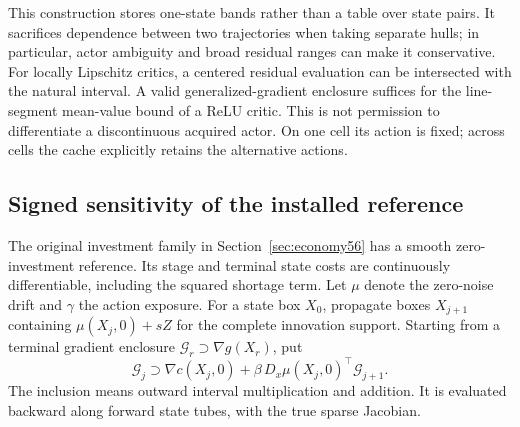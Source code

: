 This construction stores one-state bands rather than a table over state pairs. It sacrifices dependence between two trajectories when taking separate hulls; in particular, actor ambiguity and broad residual ranges can make it conservative. For locally Lipschitz critics, a centered residual evaluation can be intersected with the natural interval. A valid generalized-gradient enclosure suffices for the line-segment mean-value bound of a ReLU critic. This is not permission to differentiate a discontinuous acquired actor. On one cell its action is fixed; across cells the cache explicitly retains the alternative actions.

\subsection{Signed sensitivity of the installed reference}
The original investment family in Section~\ref{sec:economy56} has a smooth zero-investment reference. Its stage and terminal state costs are continuously differentiable, including the squared shortage term. Let $\mu$ denote the zero-noise drift and $\gamma$ the action exposure. For a state box $X_0$, propagate boxes $X_{j+1}$ containing $\mu(X_j,0)+sZ$ for the complete innovation support. Starting from a terminal gradient enclosure $\mathcal G_r\supset\nabla g(X_r)$, put
\begin{equation}\label{eq:tube56}
 \mathcal G_j\supset\nabla c(X_j,0)
                   +\beta\,D_x\mu(X_j,0)^\top\mathcal G_{j+1}.
\end{equation}
The inclusion means outward interval multiplication and addition. It is evaluated backward along forward state tubes, with the true sparse Jacobian.

